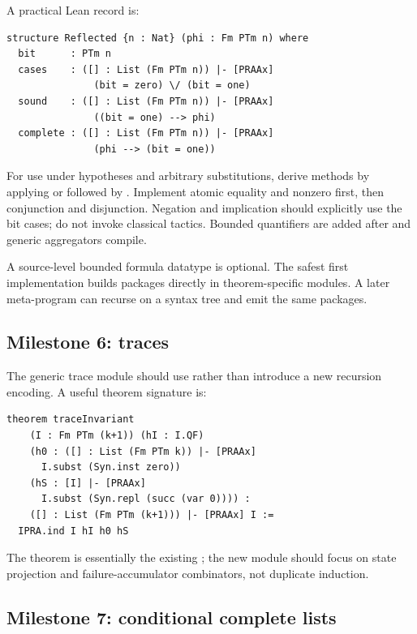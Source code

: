 A practical Lean record is:

\begin{lstlisting}[language=Lean]
structure Reflected {n : Nat} (phi : Fm PTm n) where
  bit      : PTm n
  cases    : ([] : List (Fm PTm n)) |- [PRAAx]
               (bit = zero) \/ (bit = one)
  sound    : ([] : List (Fm PTm n)) |- [PRAAx]
               ((bit = one) --> phi)
  complete : ([] : List (Fm PTm n)) |- [PRAAx]
               (phi --> (bit = one))
\end{lstlisting}

For use under hypotheses and arbitrary substitutions, derive methods by applying
 or  followed by .  Implement atomic equality and
nonzero first, then conjunction and disjunction.  Negation and implication should explicitly use the
bit cases; do not invoke classical tactics.  Bounded quantifiers are added after  and
generic aggregators compile.

A source-level bounded formula datatype is optional.  The safest first implementation builds
 packages directly in theorem-specific modules.  A later meta-program can recurse on
a syntax tree and emit the same packages.

\subsection{Milestone 6: traces}

The generic trace module should use  rather than introduce a new recursion encoding.
A useful theorem signature is:

\begin{lstlisting}[language=Lean]
theorem traceInvariant
    (I : Fm PTm (k+1)) (hI : I.QF)
    (h0 : ([] : List (Fm PTm k)) |- [PRAAx]
      I.subst (Syn.inst zero))
    (hS : [I] |- [PRAAx]
      I.subst (Syn.repl (succ (var 0)))) :
    ([] : List (Fm PTm (k+1))) |- [PRAAx] I :=
  IPRA.ind I hI h0 hS
\end{lstlisting}

The theorem is essentially the existing ; the new module should focus on state
projection and failure-accumulator combinators, not duplicate induction.

\subsection{Milestone 7: conditional complete lists}


